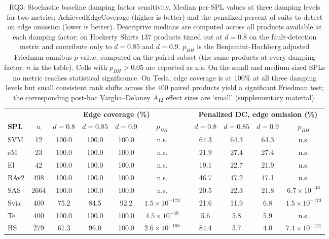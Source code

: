 \begin{table}[width=\textwidth,pos=htbp]
\caption{RQ3: Stochastic baseline damping factor sensitivity. Median per-SPL values at three damping levels for two metrics: AchievedEdgeCoverage (higher is better) and the penalized percent of suite to detect on edge omission (lower is better). Descriptive medians are computed across all products available at each damping factor; on Hockerty Shirts $137$ products timed out at $d = 0.8$ on the fault-detection metric and contribute only to $d = 0.85$ and $d = 0.9$. $p_{\mathit{BH}}$ is the Benjamini--Hochberg adjusted Friedman omnibus $p$-value, computed on the paired subset (the same products at every damping factor; $n$ in the table). Cells with $p_{\mathit{BH}} > 0.05$ are reported as n.s. On the small and medium-sized SPLs no metric reaches statistical significance. On Tesla, edge coverage is at $100\%$ at all three damping levels but small consistent rank shifts across the $400$ paired products yield a significant Friedman test; the corresponding post-hoc Vargha--Delaney $A_{12}$ effect sizes are `small' (supplementary material).}
\label{tab:rq3-damping}
\setlength{\tabcolsep}{4pt}
\begin{tabular*}{\textwidth}{@{\extracolsep{\fill}} l c cccc c cccc @{}}
\toprule
& & \multicolumn{4}{c}{\textbf{Edge coverage (\%)}} & & \multicolumn{4}{c}{\textbf{Penalized DC, edge omission (\%)}} \\
\cmidrule(lr){3-6} \cmidrule(lr){8-11}
\textbf{SPL} & \textbf{$n$} & \textbf{$d{=}0.8$} & \textbf{$d{=}0.85$} & \textbf{$d{=}0.9$} & \textbf{$p_{\mathit{BH}}$} & & \textbf{$d{=}0.8$} & \textbf{$d{=}0.85$} & \textbf{$d{=}0.9$} & \textbf{$p_{\mathit{BH}}$} \\
\midrule
SVM & 12 & 100.0 & 100.0 & 100.0 & n.s. & & 64.3 & 64.3 & 64.3 & n.s. \\
eM & 23 & 100.0 & 100.0 & 100.0 & n.s. & & 21.9 & 27.4 & 27.4 & n.s. \\
El & 42 & 100.0 & 100.0 & 100.0 & n.s. & & 19.1 & 22.7 & 21.9 & n.s. \\
BAv2 & 498 & 100.0 & 100.0 & 100.0 & n.s. & & 46.7 & 47.2 & 47.1 & n.s. \\
SAS & 2664 & 100.0 & 100.0 & 100.0 & n.s. & & 20.5 & 22.3 & 21.8 & $6.7\!\times\!10^{-46}$ \\
Svia & 400 & 75.2 & 84.5 & 92.2 & $1.5\!\times\!10^{-173}$ & & 21.6 & 11.9 & 6.8 & $1.5\!\times\!10^{-173}$ \\
Te & 400 & 100.0 & 100.0 & 100.0 & $4.5\!\times\!10^{-48}$ & & 5.6 & 5.8 & 5.9 & n.s. \\
HS & 279 & 61.3 & 96.0 & 100.0 & $2.6\!\times\!10^{-168}$ & & 84.4 & 5.7 & 4.0 & $7.4\!\times\!10^{-121}$ \\
\bottomrule
\end{tabular*}
\end{table}
